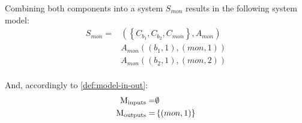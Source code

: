 Combining both components into a system $S_{mon}$ results in the following system model:
\begin{align*}
S_{mon} = & \left(\left\{ C_{b_1}, C_{b_2}, C_{mon} \right\}, A_{mon} \right) \\
& A_{mon}\left(\left(b_1, 1\right), \left(mon, 1\right) \right) \\
& A_{mon}\left(\left(b_2, 1\right), \left(mon, 2\right) \right) \\
\end{align*}

And, accordingly to \cref{def:model-in-out}:
\begin{align*}
\mathrm{M_{inputs}} = & \emptyset \\
\mathrm{M_{outputs}} = & \left\{ \left(mon, 1\right) \right\}
\end{align*}

